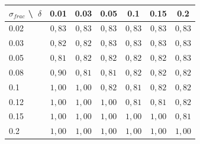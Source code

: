 
\begin{tabular}{@{}lcccccc@{}}
\toprule
$\sigma_{frac}$ \textbackslash\ $\delta$ & 0.01 & 0.03 & 0.05 & 0.1 & 0.15 & 0.2 \\
\midrule
0.02 & $0{,}83$ & $0{,}83$ & $0{,}83$ & $0{,}83$ & $0{,}83$ & $0{,}83$ \\
0.03 & $0{,}82$ & $0{,}82$ & $0{,}83$ & $0{,}83$ & $0{,}83$ & $0{,}83$ \\
0.05 & $0{,}81$ & $0{,}82$ & $0{,}82$ & $0{,}82$ & $0{,}82$ & $0{,}83$ \\
0.08 & $0{,}90$ & $0{,}81$ & $0{,}81$ & $0{,}82$ & $0{,}82$ & $0{,}82$ \\
0.1 & $1{,}00$ & $1{,}00$ & $0{,}82$ & $0{,}81$ & $0{,}82$ & $0{,}82$ \\
0.12 & $1{,}00$ & $1{,}00$ & $1{,}00$ & $0{,}81$ & $0{,}81$ & $0{,}82$ \\
0.15 & $1{,}00$ & $1{,}00$ & $1{,}00$ & $1{,}00$ & $1{,}00$ & $0{,}81$ \\
0.2 & $1{,}00$ & $1{,}00$ & $1{,}00$ & $1{,}00$ & $1{,}00$ & $1{,}00$ \\
\bottomrule
\end{tabular}
